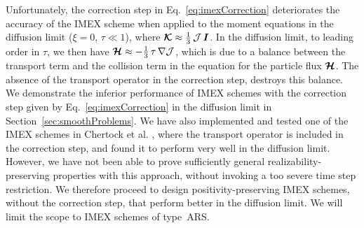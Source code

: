 Unfortunately, the correction step in Eq.~\eqref{eq:imexCorrection} deteriorates the accuracy of the IMEX scheme when applied to the moment equations in the diffusion limit ($\xi=0$, $\tau\ll 1$), where $\boldsymbol{\mathcal{K}}\approx\frac{1}{3}\,\mathcal{J}\,\boldsymbol{I}$.  
In the diffusion limit, to leading order in $\tau$, we then have $\boldsymbol{\mathcal{H}}\approx-\frac{1}{3}\,\tau\,\nabla\mathcal{J}$, which is due to a balance between the transport term and the collision term in the equation for the particle flux $\boldsymbol{\mathcal{H}}$.  
The absence of the transport operator in the correction step, destroys this balance.  
We demonstrate the inferior performance of IMEX schemes with the correction step given by Eq.~\eqref{eq:imexCorrection} in the diffusion limit in Section~\ref{sec:smoothProblems}.  
We have also implemented and tested one of the IMEX schemes in Chertock et al. \cite{chertock_etal_2015}, where the transport operator is included in the correction step, and found it to perform very well in the diffusion limit.  
However, we have not been able to prove sufficiently general realizability-preserving properties with this approach, without invoking a too severe time step restriction.  
We therefore proceed to design positivity-preserving IMEX schemes, without the correction step, that perform better in the diffusion limit.  
We will limit the scope to IMEX schemes of type~ARS.  

